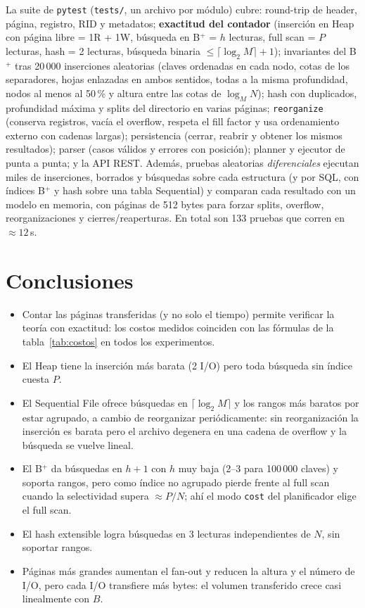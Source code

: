 \documentclass[11pt,a4paper]{article}
\newcommand{\code}[1]{\texttt{#1}}
\begin{document}
La suite de \code{pytest} (\code{tests/}, un archivo por módulo) cubre: round-trip de header,
página, registro, RID y metadatos; \textbf{exactitud del contador} (inserción en Heap con página
libre = 1R + 1W, búsqueda en B$^+$ = $h$ lecturas, full scan = $P$ lecturas, hash = 2 lecturas,
búsqueda binaria $\le\lceil\log_2 M\rceil + 1$); invariantes del B$^+$ tras 20\,000 inserciones
aleatorias (claves ordenadas en cada nodo, cotas de los separadores, hojas enlazadas en ambos
sentidos, todas a la misma profundidad, nodos al menos al 50\,\% y altura entre las cotas de
$\log_M N$); hash con duplicados, profundidad máxima y splits del directorio en varias páginas;
\code{reorganize} (conserva registros, vacía el overflow, respeta el fill factor y usa ordenamiento
externo con cadenas largas); persistencia (cerrar, reabrir y obtener los mismos resultados); parser
(casos válidos y errores con posición); planner y ejecutor de punta a punta; y la API REST. Además,
pruebas aleatorias \emph{diferenciales} ejecutan miles de inserciones, borrados y búsquedas sobre
cada estructura (y por SQL, con índices B$^+$ y hash sobre una tabla Sequential) y comparan cada
resultado con un modelo en memoria, con páginas de 512 bytes para forzar splits, overflow,
reorganizaciones y cierres/reaperturas. En total son 133 pruebas que corren en $\approx 12$\,s.

\section{Conclusiones}

\begin{itemize}
\item Contar las páginas transferidas (y no solo el tiempo) permite verificar la teoría con exactitud:
  los costos medidos coinciden con las fórmulas de la tabla~\ref{tab:costos} en todos los
  experimentos.
\item El Heap tiene la inserción más barata (2 I/O) pero toda búsqueda sin índice cuesta $P$.
\item El Sequential File ofrece búsquedas en $\lceil\log_2 M\rceil$ y los rangos más baratos por estar
  agrupado, a cambio de reorganizar periódicamente: sin reorganización la inserción es barata pero
  el archivo degenera en una cadena de overflow y la búsqueda se vuelve lineal.
\item El B$^+$ da búsquedas en $h+1$ con $h$ muy baja (2--3 para 100\,000 claves) y soporta rangos,
  pero como índice no agrupado pierde frente al full scan cuando la selectividad supera
  $\approx P/N$; ahí el modo \code{cost} del planificador elige el full scan.
\item El hash extensible logra búsquedas en 3 lecturas independientes de $N$, sin soportar rangos.
\item Páginas más grandes aumentan el fan-out y reducen la altura y el número de I/O, pero cada I/O
  transfiere más bytes: el volumen transferido crece casi linealmente con $B$.
\end{itemize}
\end{document}
